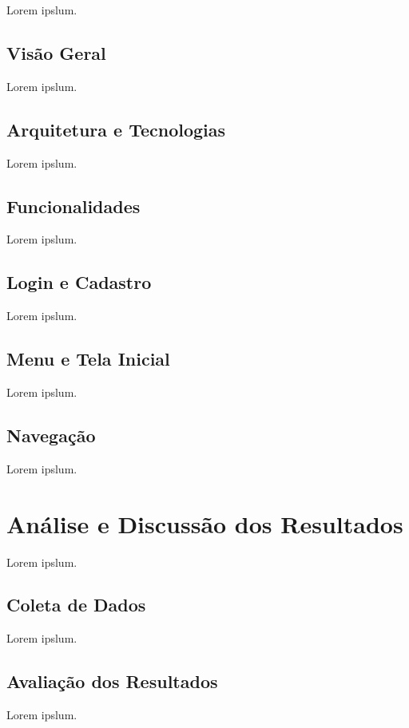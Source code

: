 \documentclass[english,brazilian]{UNISINOSartigo} %
\begin{document}
Lorem ipslum.

\subsection{Visão Geral}

Lorem ipslum.

\subsection{Arquitetura e Tecnologias}

Lorem ipslum.

\subsection{Funcionalidades}

Lorem ipslum.

\subsection{Login e Cadastro}

Lorem ipslum.

\subsection{Menu e Tela Inicial}

Lorem ipslum.

\subsection{Navegação}

Lorem ipslum.

\section{Análise e Discussão dos Resultados}

Lorem ipslum.

\subsection{Coleta de Dados}

Lorem ipslum.

\subsection{Avaliação dos Resultados}

Lorem ipslum.
\end{document}
